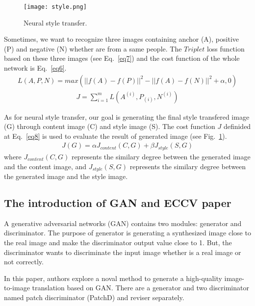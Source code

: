 \documentclass[a4paper]{article}
\begin{document}
\begin{figure}
\begin{center}
\texttt{[image: style.png]}
\end{center}
\caption{Neural style transfer.}
\label{fig9}
\end{figure}
Sometimes, we want to recognize three images containing anchor (A), positive (P) and negative (N) whether are from a same people. The $Triplet$ loss function based on these three images (see Eq.~\ref{eq7}) and the cost function of the whole network is Eq.~\ref{eq6}.\\
\begin{gather}
L(A,P,N) = max(||f(A) - f(P)||^2 - ||f(A) - f(N)||^2 + \alpha, 0)
\label{eq7}
\end{gather}
\begin{gather}
J = \sum_{i=1}^mL(A^{(i)},P_{(i)},N^{(i)})
\label{eq6}
\end{gather}

As for neural style transfer, our goal is generating the final style transfered image (G) through content image (C) and style image (S). The cost function $J$ definided at Eq.~\ref{eq8} is used to evaluate the result of generated image (see Fig.~\ref{fig9}).\\
\begin{gather}
J(G) = \alpha J_{content}(C,G) + \beta J_{style}(S,G)
\label{eq8}
\end{gather}
where $J_{content}(C,G)$ represents the similary degree between the generated image and the content image, and $J_{style}(S,G)$ represents the similary degree between the generated image and the style image.

\subsection{The introduction of GAN and ECCV paper}

A generative adversarial networks (GAN) contains two modules: generator and discriminator. The purpose of generator is generating a synthesized image close to the real image and make the discriminator output value close to 1. But, the discriminator wants to discriminate the input image whether is a real image or not correctly. 

In this paper, authors explore a noval method to generate a high-quality image-to-image translation based on GAN. There are a generator and two discriminator named patch discriminator (PatchD) and reviser separately. 
\end{document}
